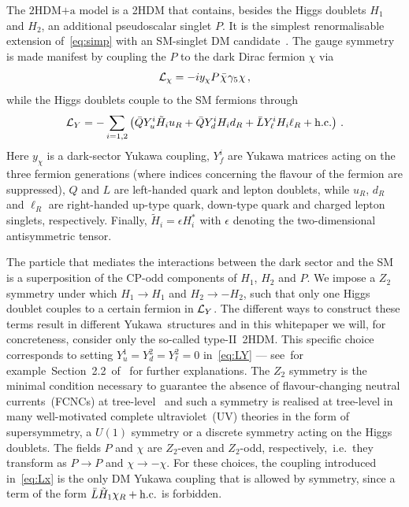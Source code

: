 \documentclass[a4paper, 11pt,notoc]{article}
\newcommand{\hdma}{\ensuremath{\textrm{2HDM+a}}\xspace}
\begin{document}
The \hdma model is a 2HDM that contains, besides the Higgs doublets $H_1$ and $H_2$, an additional pseudoscalar singlet $P$. It is the simplest renormalisable extension of~\eqref{eq:simp} with an SM-singlet DM candidate~\cite{Ipek:2014gua,No:2015xqa,Goncalves:2016iyg,Bauer:2017ota,Tunney:2017yfp}. The gauge symmetry is made manifest by coupling the $P$ to the dark Dirac fermion  $\chi$ via
\begin{equation} \label{eq:Lx}
{\cal L}_\chi = - i y_\chi P \hspace{0.25mm} \bar \chi \hspace{0.25mm} \gamma_5 \hspace{0.1mm} \chi \,,
\end{equation}
while the Higgs doublets couple to the SM fermions through
\begin{equation} \label{eq:LY}
{\cal L}_{Y} = - \sum_{i=1,2} \left ( \bar Q Y_u^i \tilde H_i u_R  + \bar Q Y_d^i H_i d_R   + \bar L Y_\ell^i H_i \ell_R  + {\rm h.c.}  \right ) \,.
\end{equation}
Here $y_\chi$ is a dark-sector Yukawa coupling, $Y_f^i$ are Yukawa matrices acting on the three fermion generations (where indices concerning the flavour of the fermion are suppressed), $Q$ and $L$ are left-handed quark and lepton doublets, while $u_R$, $d_R$ and $\ell_R$ are right-handed up-type quark, down-type quark and charged lepton singlets, respectively. Finally, $\tilde H_i = \epsilon H_i^\ast$ with $\epsilon$ denoting the  two-dimensional antisymmetric tensor.

The particle that mediates the interactions between the dark sector and the SM is a superposition of the CP-odd components of $H_1$, $H_2$ and $P$. We impose a $Z_2$ symmetry under which $H_1\to H_1$ and $H_2\to -H_2$, such that only one Higgs doublet couples to a certain fermion in ${\cal L}_{Y}$. The different ways to construct these terms result in different Yukawa~structures and in this whitepaper we will, for concreteness, consider only the so-called type-II~2HDM. This specific choice corresponds to setting $Y_u^1  = Y_d^2 = Y_\ell^2 =0$ in~\eqref{eq:LY} --- see~for example~Section~2.2~of~\cite{Bauer:2017ota} for further explanations.  The $Z_2$ symmetry is the minimal condition necessary to guarantee the absence of flavour-changing neutral currents~(FCNCs) at tree-level~\cite{Glashow:1976nt,Paschos:1976ay} and such a symmetry is realised at tree-level in many well-motivated complete ultraviolet~(UV) theories in the form of supersymmetry, a $U(1)$ symmetry or  a discrete symmetry acting on the Higgs doublets. The fields $P$ and $\chi$ are $Z_2$-even and $Z_2$-odd, respectively,~i.e.~they transform as $P \to P$ and $\chi \to -\chi$. For these choices, the coupling introduced in~\eqref{eq:Lx} is the only DM Yukawa coupling that is allowed by symmetry, since  a term of the form $\bar L  \tilde H_1 \chi_R + {\rm h.c.}$ is forbidden. 
\end{document}
